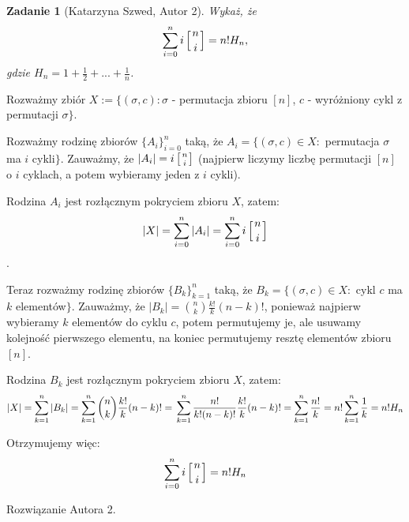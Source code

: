 \documentclass{mwart}
\newtheorem{zad}{Zadanie}[section]
\begin{document}
\begin{zad}[Katarzyna Szwed, Autor 2]
    Wykaż, że
    \[
        \sum_{i=0}^{n} i \left[ n \atop i \right] = n! H_n,
    \]
    gdzie $H_n = 1 + \frac{1}{2} + ... + \frac{1}{n}$.
\end{zad}
\begin{mdframed}
    Rozważmy zbiór $X := \{(\sigma, c) : \sigma$ - permutacja zbioru $[n]$, $c$ - wyróżniony cykl z permutacji $\sigma\}$.

    Rozważmy rodzinę zbiorów $\{A_i\}_{i=0}^{n}$ taką, że $A_i = \{(\sigma, c) \in X :$ permutacja $\sigma$ ma $i$ cykli$\}$.
    Zauważmy, że $|A_i| = i\left[ n \atop i\right]$ (najpierw liczymy liczbę permutacji $[n]$ o $i$ cyklach, a potem wybieramy
    jeden z $i$ cykli).

    Rodzina $A_i$ jest rozłącznym pokryciem zbioru $X$, zatem:
    \[|X| = \sum_{i=0}^{n} |A_i| = \sum_{i=0}^{n} i\left[ n \atop i\right]\].

    Teraz rozważmy rodzinę zbiorów $\{B_k\}_{k=1}^{n}$ taką, że $B_k = \{(\sigma, c) \in X :$ cykl $c$ ma $k$ elementów$\}$.
    Zauważmy, że $|B_k| = {n \choose k} \frac{k!}{k} (n-k)!$, ponieważ najpierw wybieramy $k$ elementów do cyklu $c$, potem permutujemy
    je, ale usuwamy kolejność pierwszego elementu, na koniec permutujemy resztę elementów zbioru $[n]$.

    Rodzina $B_k$ jest rozłącznym pokryciem zbioru $X$, zatem:
    \[
        |X| = \sum_{k=1}^{n} |B_k| = \sum_{k=1}^{n} {n \choose k} \frac{k!}{k} (n-k)! = \\
        \sum_{k=1}^n \frac{n!}{k!(n-k)!}\frac{k!}{k} (n-k)! = \sum_{k=1}^{n}\frac{n!}{k} =
        n! \sum_{k=1}^{n} \frac{1}{k} = n! H_n
    \]

    Otrzymujemy więc:
    \[\sum_{i=0}^{n} i\left[ n \atop i\right] = n! H_n\]


\end{mdframed}
\begin{mdframed}
    Rozwiązanie Autora 2.
\end{mdframed}
\end{document}
